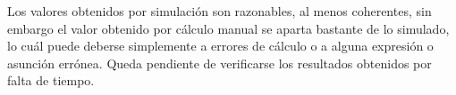
Los valores obtenidos por simulación son razonables, al menos coherentes, sin embargo el valor obtenido por cálculo manual se aparta bastante de lo simulado, lo cuál puede deberse simplemente a errores de cálculo o a alguna expresión o asunción errónea. Queda pendiente de verificarse los resultados obtenidos por falta de tiempo.
